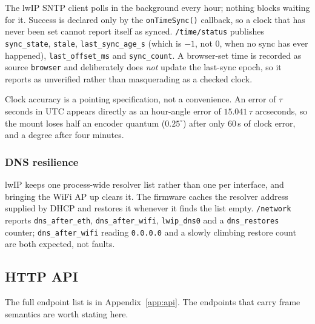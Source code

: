 \documentclass[11pt,a4paper]{article}
\begin{document}
The lwIP SNTP client polls in the background every hour; nothing blocks waiting for it. Success is declared only by the \texttt{onTimeSync()} callback, so a clock that has never been set cannot report itself as synced. \texttt{/time/status} publishes \texttt{sync\_state}, \texttt{stale}, \texttt{last\_sync\_age\_s} (which is $-1$, not 0, when no sync has ever happened), \texttt{last\_offset\_ms} and \texttt{sync\_count}. A browser-set time is recorded as source \texttt{browser} and deliberately does \emph{not} update the last-sync epoch, so it reports as unverified rather than masquerading as a checked clock.

Clock accuracy is a pointing specification, not a convenience. An error of $\tau$ seconds in UTC appears directly as an hour-angle error of $15.041\,\tau$ arcseconds, so the mount loses half an encoder quantum ($0.25^\circ$) after only 60\,s of clock error, and a degree after four minutes.

\subsubsection{DNS resilience}

lwIP keeps one process-wide resolver list rather than one per interface, and bringing the WiFi AP up clears it. The firmware caches the resolver address supplied by DHCP and restores it whenever it finds the list empty. \texttt{/network} reports \texttt{dns\_after\_eth}, \texttt{dns\_after\_wifi}, \texttt{lwip\_dns0} and a \texttt{dns\_restores} counter; \texttt{dns\_after\_wifi} reading \texttt{0.0.0.0} and a slowly climbing restore count are both expected, not faults.

\subsection{HTTP API}

The full endpoint list is in Appendix~\ref{app:api}. The endpoints that carry frame semantics are worth stating here.
\end{document}
